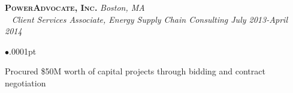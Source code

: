 \documentclass[11pt]{article}
\newcommand{\employer}[4]{
	{\hspace*{-20pt} {\small{\textbf{\textsc{ #1}}}}
  \hfill \small{\emph{#2}}\\ ~\hspace*{-20pt} \small \emph{ #3 \hfill #4}}\\ }
\newenvironment{achievements}{\begin{list}{$\bullet$}{\topsep .0001pt \itemsep -2pt}}{\vspace*{5pt}\end{list} }
\begin{document}
\employer{PowerAdvocate, Inc.} {Boston, MA} {Client Services Associate, Energy Supply Chain Consulting} {July 2013-April 2014}
	\begin{achievements}
		\item Procured \$50M worth of capital projects through bidding and contract negotiation
	\end{achievements} 


	
\end{document}
